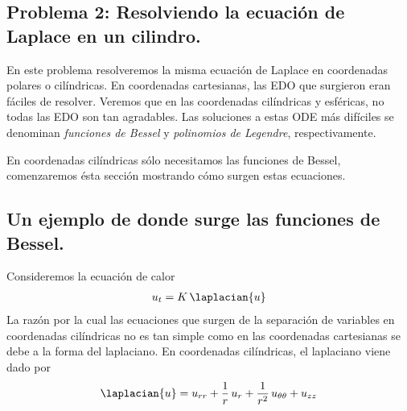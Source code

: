 \subsection{Problema 2: Resolviendo la ecuación de Laplace en un cilindro.}
En este problema resolveremos la misma ecuación de Laplace en coordenadas polares o cilíndricas. En coordenadas cartesianas, las EDO que surgieron eran fáciles de resolver. Veremos que en las coordenadas cilíndricas y esféricas, no todas las EDO son tan agradables. Las soluciones a estas ODE más difíciles se denominan \emph{funciones de Bessel} y \emph{polinomios de Legendre}, respectivamente.
\par
En coordenadas cilíndricas sólo necesitamos las funciones de Bessel, comenzaremos ésta sección mostrando cómo surgen estas ecuaciones.
\subsection*{Un ejemplo de donde surge las funciones de Bessel.}
Consideremos la ecuación de calor
\begin{align*}
u_{t} = K \, \laplacian{u}
\end{align*}
La razón por la cual las ecuaciones que surgen de la separación de variables en coordenadas cilíndricas no es tan simple como en las coordenadas cartesianas se debe a la forma del laplaciano. En coordenadas cilíndricas, el laplaciano viene dado por
\begin{align*}
\laplacian{u} = u_{r r} + \dfrac{1}{r} \, u_{r} + \dfrac{1}{r^{2}} \, u_{\theta \theta} + u_{z z}
\end{align*}


